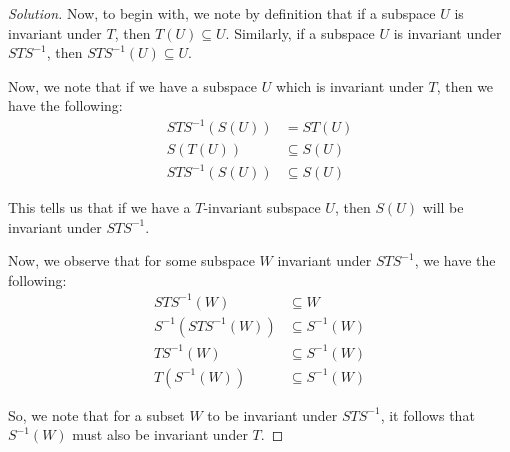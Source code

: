 \documentclass{article}
\newenvironment{solution}{\begin{proof}[Solution]}{\end{proof}}
\renewcommand\qedsymbol{$\blacksquare$}
\newenvironment{innerproof}{\renewcommand{\qedsymbol}{$\square$}\proof}{\endproof}
\begin{document}
\begin{solution}
	\begin{comment}
		Before we proceed, we will introduce the following lemma:
		\begin{lem}
		For a finite-dimensional vector space $V$, let $S \in \mathcal L(V)$ be invertible. Then, for subspace $U$ which is invariant under $S$, $U$ is also invariant under $S^{-1}$
	\end{lem}
	\begin{innerproof}
		We observe that if $U$ is invariant under $S$, then $S(U) \subseteq U$.
		
		Furthermore, we note that since $S$ is invertible, then $\dim S(U) = \dim U$; so, we can conclude that $S(U) = U$.
		
		From here, observe that for any $u \in U$, we can write it as $T(w)$ for some $w \in U$. Then, we observe that $T^{-1}(u) = w$. In other words, we note that for any $u \in U$, we have $T^{-1}(u) \in U$ as well. Thus, $U$ must then be invariant under $S^{-1}$ as well.
	\end{innerproof}
	\end{comment}
	
	Now, to begin with, we note by definition that if a subspace $U$ is invariant under $T$, then $T(U) \subseteq U$. Similarly, if a subspace $U$ is invariant under $STS^{-1}$, then $STS^{-1}(U) \subseteq U$.
	
	Now, we note that if we have a subspace $U$ which is invariant under $T$, then we have the following:
	\begin{align*}
		STS^{-1}(S(U)) &= ST(U) \\
		S(T(U)) &\subseteq S(U) \\
		STS^{-1}(S(U)) &\subseteq S(U)
	\end{align*}
	
	This tells us that if we have a $T$-invariant subspace $U$, then $S(U)$ will be invariant under $STS^{-1}$.
	
	Now, we observe that for some subspace $W$ invariant under $STS^{-1}$, we have the following:
	\begin{align*}
		STS^{-1}(W) &\subseteq W \\
		S^{-1}(STS^{-1}(W)) &\subseteq S^{-1}(W) \\
		TS^{-1}(W) &\subseteq S^{-1}(W) \\
		T(S^{-1}(W)) &\subseteq S^{-1}(W)
	\end{align*}
	
	So, we note that for a subset $W$ to be invariant under $STS^{-1}$, it follows that $S^{-1}(W)$ must also be invariant under $T$.
	

\end{solution}
\end{document}
